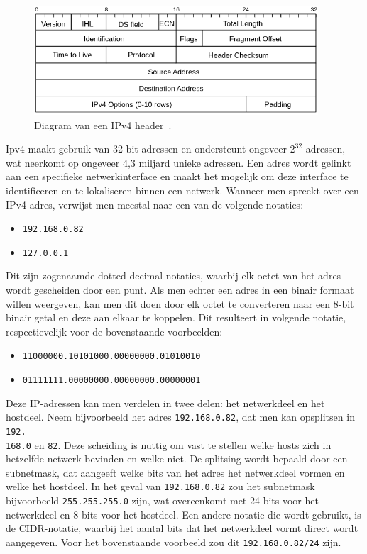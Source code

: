 \begin{figure}[h!]
    \begin{center}
        \includegraphics[width=300pt]
        {./graphics/network/ipv4-header.png}
        \caption[IPv4 header diagram.]{\label{fig:network-ipv4-header}Diagram van een IPv4 header~\autocite{dordal2020}.}
    \end{center}
\end{figure}

Ipv4 maakt gebruik van 32-bit adressen en ondersteunt ongeveer \(2^{32}\) adressen, wat neerkomt op ongeveer 4,3 miljard unieke adressen.
Een adres wordt gelinkt aan een specifieke netwerkinterface en maakt het mogelijk om deze interface te identificeren en te lokaliseren binnen een netwerk.
Wanneer men spreekt over een IPv4-adres, verwijst men meestal naar een van de volgende notaties:

\begin{itemize}
    \item \texttt{192.168.0.82}
    \item \texttt{127.0.0.1}
\end{itemize}

Dit zijn zogenaamde dotted-decimal notaties, waarbij elk octet van het adres wordt gescheiden door een punt.
Als men echter een adres in een binair formaat willen weergeven, kan men dit doen door elk octet te converteren naar een 8-bit binair getal en deze aan elkaar te koppelen.
Dit resulteert in volgende notatie, respectievelijk voor de bovenstaande voorbeelden:

\begin{itemize}
    \item \texttt{11000000.10101000.00000000.01010010}
    \item \texttt{01111111.00000000.00000000.00000001}
\end{itemize}

Deze IP-adressen kan men verdelen in twee delen: het netwerkdeel en het hostdeel.
Neem bijvoorbeeld het adres \texttt{192.168.0.82}, dat men kan opsplitsen in \texttt{192.\\ 168.0} en \texttt{82}.
Deze scheiding is nuttig om vast te stellen welke hosts zich in hetzelfde netwerk bevinden en welke niet.
De splitsing wordt bepaald door een subnetmask, dat aangeeft welke bits van het adres het netwerkdeel vormen en welke het hostdeel.
In het geval van \texttt{192.168.0.82} zou het subnetmask bijvoorbeeld \texttt{255.255.255.0} zijn, wat overeenkomt met 24 bits voor het netwerkdeel en 8 bits voor het hostdeel.
Een andere notatie die wordt gebruikt, is de CIDR-notatie, waarbij het aantal bits dat het netwerkdeel vormt direct wordt aangegeven.
Voor het bovenstaande voorbeeld zou dit \texttt{192.168.0.82/24} zijn.

